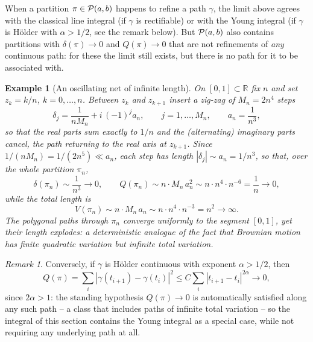 \documentclass[11pt,fleqn]{article}
\def\R{\mathbb R}
\theoremstyle{plain}
\newtheorem{example}[thm]{Example}
\theoremstyle{remark}
\newtheorem{remark}[thm]{Remark}
\begin{document}
When a partition $\pi\in{\cal P}(a,b)$ happens to refine a path $\gamma$,
the limit above agrees with the classical line integral (if $\gamma$ is
rectifiable) or with the Young integral (if $\gamma$ is H\"older with
$\alpha>1/2$, see the remark below). But ${\cal P}(a,b)$ also contains
partitions with $\delta(\pi)\to0$ and $Q(\pi)\to0$ that are not refinements
of \emph{any} continuous path: for these the limit still exists, but there
is no path for it to be associated with.

\begin{example}[An oscillating net of infinite length]\label{ex:oscillating}
On $[0,1]\subset\R$ fix $n$ and set $z_k=k/n$, $k=0,\ldots,n$. Between $z_k$
and $z_{k+1}$ insert a zig-zag of $M_n=2n^4$ steps
\[
\delta_j=\frac1{nM_n}+i\,(-1)^ja_n,\qquad j=1,\ldots,M_n,\qquad a_n=\frac1{n^3},
\]
so that the real parts sum exactly to $1/n$ and the (alternating) imaginary
parts cancel, the path returning to the real axis at $z_{k+1}$. Since
$1/(nM_n)=1/(2n^5)\ll a_n$, each step has length $|\delta_j|\sim a_n=1/n^3$,
so that, over the whole partition $\pi_n$,
\[
\delta(\pi_n)\sim\frac1{n^3}\longrightarrow0,\qquad
Q(\pi_n)\sim n\cdot M_n\,a_n^2\sim n\cdot n^4\cdot n^{-6}=\frac1n\longrightarrow0,
\]
while the total length is
\[
V(\pi_n)\sim n\cdot M_n\,a_n\sim n\cdot n^4\cdot n^{-3}=n^2\longrightarrow\infty.
\]
The polygonal paths through $\pi_n$ converge uniformly to the segment
$[0,1]$, yet their length explodes: a deterministic analogue of the fact
that Brownian motion has finite quadratic variation but infinite total
variation.
\end{example}

\begin{remark}\label{rem:holder}
Conversely, if $\gamma$ is H\"older continuous with exponent $\alpha>1/2$,
then
\[
Q(\pi)=\sum_i|\gamma(t_{i+1})-\gamma(t_i)|^2\le C\sum_i|t_{i+1}-t_i|^{2\alpha}
\longrightarrow0,
\]
since $2\alpha>1$: the standing hypothesis $Q(\pi)\to0$ is automatically
satisfied along any such path -- a class that includes paths of infinite
total variation -- so the integral of this section contains the Young
integral as a special case, while not requiring any underlying path at
all.
\end{remark}
\end{document}
